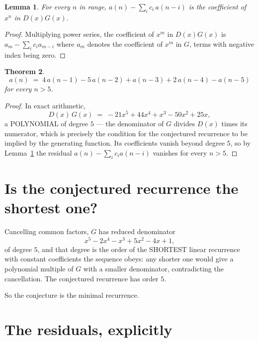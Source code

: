\documentclass[11pt,a4paper]{article}
\theoremstyle{plain}
\newtheorem{theorem}{Theorem}
\newtheorem{lemma}[theorem]{Lemma}
\theoremstyle{definition}
\begin{document}
\begin{lemma}\label{lem:key}
For every $n$ in range, $a(n)-\sum_i c_i\,a(n-i)$ is the coefficient of $x^{n}$ in
$D(x)G(x)$.
\end{lemma}

\begin{proof}
Multiplying power series, the coefficient of $x^{m}$ in $D(x)G(x)$ is
$a_m-\sum_i c_i a_{m-i}$ where $a_m$ denotes the coefficient of $x^{m}$ in $G$, terms with
negative index being zero.
\end{proof}

\begin{theorem}
\[
a(n)\;=\;4\,a(n-1) - 5\,a(n-2) + a(n-3) + 2\,a(n-4) - a(n-5)
\]
for every $n>5$.
\end{theorem}

\begin{proof}
In exact arithmetic,
\[
D(x)\,G(x)\;=\;- 21 x^{5} + 44 x^{4} + x^{3} - 50 x^{2} + 25 x,
\]
a POLYNOMIAL of degree $5$ --- the denominator of $G$ divides $D(x)$ times its numerator,
which is precisely the condition for the conjectured recurrence to be implied by the
generating function. Its coefficients vanish beyond degree $5$, so by
Lemma~\ref{lem:key} the residual $a(n)-\sum_ic_ia(n-i)$ vanishes for every
$n>5$.
\end{proof}

\section{Is the conjectured recurrence the shortest one?}

Cancelling common factors, $G$ has reduced denominator
\[
x^{5} - 2 x^{4} - x^{3} + 5 x^{2} - 4 x + 1,
\]
of degree $5$, and that degree is the order of the SHORTEST linear recurrence with
constant coefficients the sequence obeys: any shorter one would give a polynomial multiple of
$G$ with a smaller denominator, contradicting the cancellation. The conjectured recurrence has
order $5$.

So the conjecture is the minimal recurrence.

\section{The residuals, explicitly}
\end{document}
